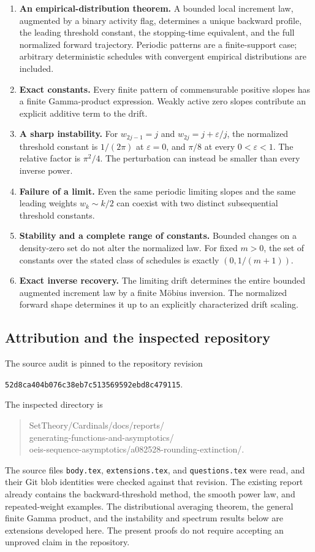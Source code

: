 \begin{enumerate}
 \item \textbf{An empirical-distribution theorem.} A bounded local
 increment law, augmented by a binary activity flag, determines a
 unique backward profile, the leading threshold constant, the
 stopping-time equivalent, and the full normalized forward trajectory.
 Periodic patterns are a finite-support case; arbitrary deterministic
 schedules with convergent empirical distributions are included.
 \item \textbf{Exact constants.} Every finite pattern of commensurable
 positive slopes has a finite Gamma-product expression. Weakly active
 zero slopes contribute an explicit additive term to the drift.
 \item \textbf{A sharp instability.} For
 $w_{2j-1}=j$ and $w_{2j}=j+\varepsilon/j$, the normalized threshold
 constant is $1/(2\pi)$ at $\varepsilon=0$, and $\pi/8$ at every
 $0<\varepsilon<1$. The relative factor is $\pi^2/4$.
 The perturbation can instead be smaller than every inverse power.
 \item \textbf{Failure of a limit.} Even the same periodic limiting
 slopes and the same leading weights $w_k\sim k/2$ can coexist with
 two distinct subsequential threshold constants.
 \item \textbf{Stability and a complete range of constants.} Bounded
 changes on a density-zero set do not alter the normalized law.
 For fixed $m>0$, the set of constants over the stated class of
 schedules is exactly $(0,1/(m+1))$.
 \item \textbf{Exact inverse recovery.} The limiting drift determines
 the entire bounded augmented increment law by a finite M\"obius
 inversion. The normalized forward shape determines it up to an
 explicitly characterized drift scaling.
\end{enumerate}

\subsection{Attribution and the inspected repository}

The source audit is pinned to the repository revision
\begin{center}\small
\texttt{52d8ca404b076c38eb7c513569592ebd8c479115}.
\end{center}
The inspected directory is
\begin{quote}\small\ttfamily
SetTheory/Cardinals/docs/reports/\\
generating-functions-and-asymptotics/\\
oeis-sequence-asymptotics/a082528-rounding-extinction/.
\end{quote}
The source files \texttt{body.tex}, \texttt{extensions.tex}, and
\texttt{questions.tex} were read, and their Git blob identities were
checked against that revision. The existing report already contains the
backward-threshold method, the smooth power law, and repeated-weight
examples. The distributional averaging theorem, the general finite
Gamma product, and the instability and spectrum results below are
extensions developed here. The present proofs do not require accepting
an unproved claim in the repository.

